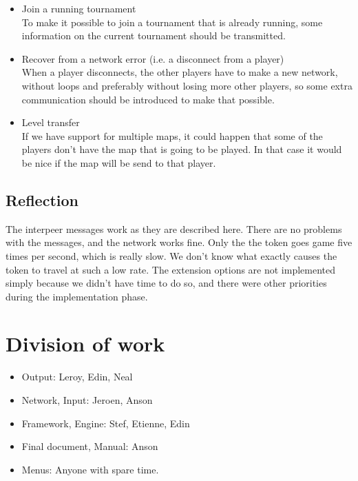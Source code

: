     \begin{itemize}
     \item Join a running tournament \\
     To make it possible to join a tournament that is already running, some information on the current tournament should be transmitted.
     \item Recover from a network error (i.e. a disconnect from a player) \\
     When a player disconnects, the other players have to make a new network, without loops and preferably without losing more other players, so some extra communication should be introduced to make that possible.
     \item Level transfer \\
     If we have support for multiple maps, it could happen that some of the players don't have the map that is going to be played. In that case it would be nice if the map will be send to that player.
    \end{itemize}

    \subsection{Reflection}
    The interpeer messages work as they are described here. There are no problems with the messages, and the network works fine. Only the the token goes game five times per second, which is really slow. We don't know what exactly causes the token to travel at such a low rate. The extension options are not implemented simply because we didn't have time to do so, and there were other priorities during the implementation phase.

    \newpage

    \newpage
    \section{Division of work}

    \begin{itemize}

      \item Output: Leroy, Edin, Neal

      \item Network, Input: Jeroen, Anson

      \item Framework, Engine: Stef, Etienne, Edin

      \item Final document, Manual: Anson

      \item Menus: Anyone with spare time.

    \end{itemize}

